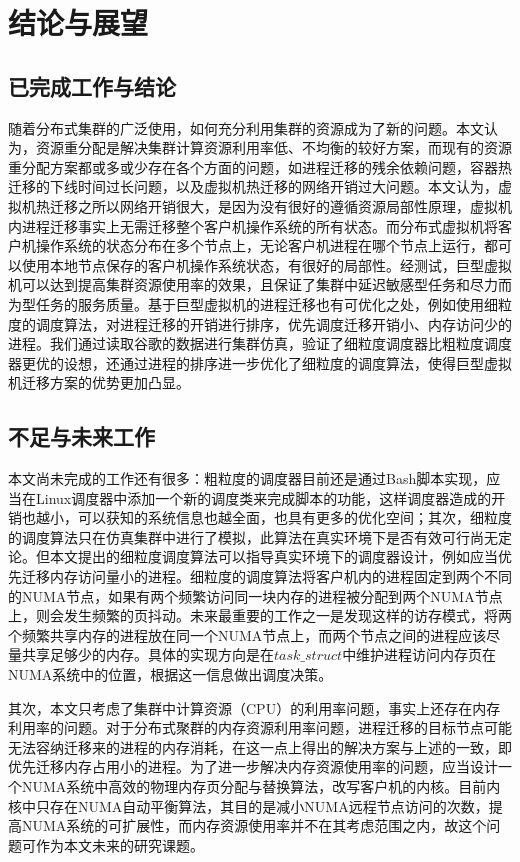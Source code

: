 
\chapter{结论与展望}

\section{已完成工作与结论}
随着分布式集群的广泛使用，如何充分利用集群的资源成为了新的问题。本文认为，资源重分配是解决集群计算资源利用率低、不均衡的较好方案，而现有的资源重分配方案都或多或少存在各个方面的问题，如进程迁移的残余依赖问题，容器热迁移的下线时间过长问题，以及虚拟机热迁移的网络开销过大问题。本文认为，虚拟机热迁移之所以网络开销很大，是因为没有很好的遵循资源局部性原理，虚拟机内进程迁移事实上无需迁移整个客户机操作系统的所有状态。而分布式虚拟机将客户机操作系统的状态分布在多个节点上，无论客户机进程在哪个节点上运行，都可以使用本地节点保存的客户机操作系统状态，有很好的局部性。经测试，巨型虚拟机可以达到提高集群资源使用率的效果，且保证了集群中延迟敏感型任务和尽力而为型任务的服务质量。基于巨型虚拟机的进程迁移也有可优化之处，例如使用细粒度的调度算法，对进程迁移的开销进行排序，优先调度迁移开销小、内存访问少的进程。我们通过读取谷歌的数据进行集群仿真，验证了细粒度调度器比粗粒度调度器更优的设想，还通过进程的排序进一步优化了细粒度的调度算法，使得巨型虚拟机迁移方案的优势更加凸显。

\section{不足与未来工作}
本文尚未完成的工作还有很多：粗粒度的调度器目前还是通过Bash脚本实现，应当在Linux调度器中添加一个新的调度类来完成脚本的功能，这样调度器造成的开销也越小，可以获知的系统信息也越全面，也具有更多的优化空间；其次，细粒度的调度算法只在仿真集群中进行了模拟，此算法在真实环境下是否有效可行尚无定论。但本文提出的细粒度调度算法可以指导真实环境下的调度器设计，例如应当优先迁移内存访问量小的进程。细粒度的调度算法将客户机内的进程固定到两个不同的NUMA节点，如果有两个频繁访问同一块内存的进程被分配到两个NUMA节点上，则会发生频繁的页抖动。未来最重要的工作之一是发现这样的访存模式，将两个频繁共享内存的进程放在同一个NUMA节点上，而两个节点之间的进程应该尽量共享足够少的内存。具体的实现方向是在$task\_struct$中维护进程访问内存页在NUMA系统中的位置，根据这一信息做出调度决策。

其次，本文只考虑了集群中计算资源（CPU）的利用率问题，事实上还存在内存利用率的问题。对于分布式聚群的内存资源利用率问题，进程迁移的目标节点可能无法容纳迁移来的进程的内存消耗，在这一点上得出的解决方案与上述的一致，即优先迁移内存占用小的进程。为了进一步解决内存资源使用率的问题，应当设计一个NUMA系统中高效的物理内存页分配与替换算法，改写客户机的内核。目前内核中只存在NUMA自动平衡算法\cite{balancing}，其目的是减小NUMA远程节点访问的次数，提高NUMA系统的可扩展性，而内存资源使用率并不在其考虑范围之内，故这个问题可作为本文未来的研究课题。
